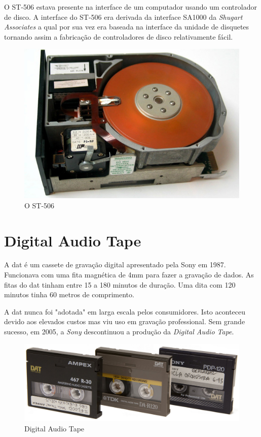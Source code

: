 \documentclass{report}
\begin{document}
	O ST-506 estava presente na interface de um computador usando um controlador de disco. A interface do ST-506 era derivada da interface SA1000 da \textit{Shugart Associates}  a qual por sua vez era baseada na interface da unidade de disquetes tornando assim a fabricação de controladores de disco relativamente fácil.
\vspace{1mm}

	\begin{figure} [h]
		\centering
		\includegraphics[scale=0.3]{st-506.jpg}
		\caption{O ST-506}
	\end{figure}		
\newpage

		\section{Digital Audio Tape}
	A \ac{dat} é um cassete de gravação digital apresentado pela Sony em 1987.	
	Funcionava com uma fita magnética de 4mm para fazer a gravação de dados. As fitas do \ac{dat} tinham entre 15 a 180 minutos de duração. Uma dita com 120 minutos tinha 60 metros de comprimento.
	
	A \ac{dat} nunca foi "adotada" em larga escala pelos consumidores. Isto aconteceu devido aos elevados custos mas viu uso em gravação professional.
	Sem grande sucesso, em 2005, a \textit{Sony} descontinuou a produção da \textit{Digital Audio Tape}.
	 
	
	\begin{figure} [h]
		\centering
		\includegraphics[scale=0.3]{dat.jpg}
		\caption{Digital Audio Tape}
	\end{figure}
\end{document}
